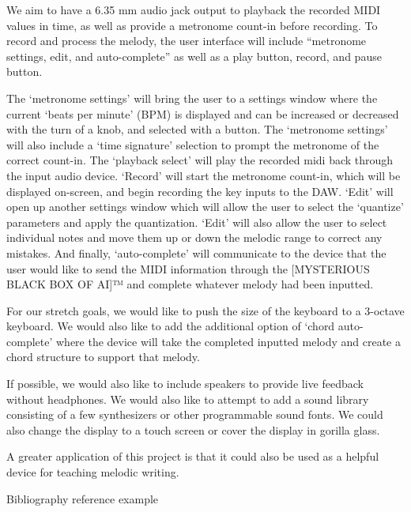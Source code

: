 We aim to have a 6.35 mm audio jack output to playback the recorded MIDI values in
time, as well as provide a metronome count-in before recording. To record and process the
melody, the user interface will include “metronome settings, edit, and auto-complete” as well
as a play button, record, and pause button.

The ‘metronome settings’ will bring the user to a settings window where the current
‘beats per minute’ (BPM) is displayed and can be increased or decreased with the turn of a
knob, and selected with a button. The ‘metronome settings’ will also include a ‘time signature’
selection to prompt the metronome of the correct count-in. The ‘playback select’ will play the
recorded midi back through the input audio device. ‘Record’ will start the metronome count-in,
which will be displayed on-screen, and begin recording the key inputs to the DAW. ‘Edit’ will
open up another settings window which will allow the user to select the ‘quantize’ parameters
and apply the quantization. ‘Edit’ will also allow the user to select individual notes and move
them up or down the melodic range to correct any mistakes. And finally, ‘auto-complete’ will
communicate to the device that the user would like to send the MIDI information through the
[MYSTERIOUS BLACK BOX OF AI]™ and complete whatever melody had been inputted.

For our stretch goals, we would like to push the size of the keyboard to a 3-octave
keyboard. We would also like to add the additional option of ‘chord auto-complete’ where the
device will take the completed inputted melody and create a chord structure to support that
melody.

If possible, we would also like to include speakers to provide live feedback without
headphones. We would also like to attempt to add a sound library consisting of a few
synthesizers or other programmable sound fonts. We could also change the display to a touch
screen or cover the display in gorilla glass.

A greater application of this project is that it could also be used as a helpful device for
teaching melodic writing.

Bibliography reference example \autocite{adams1995hitchhiker}
